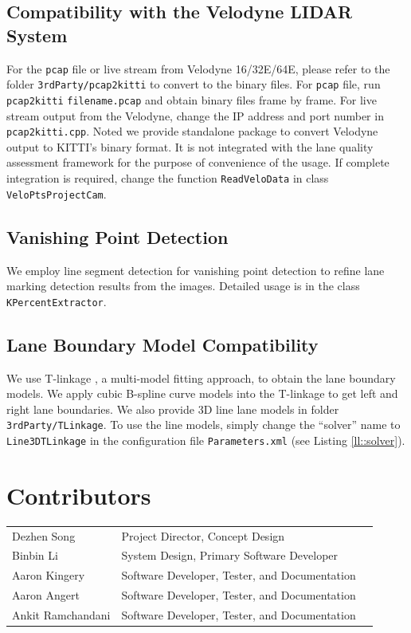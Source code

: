 \documentclass[a4paper]{article}
\begin{document}
\subsection{Compatibility with the Velodyne LIDAR System}

For the \verb+pcap+ file or  live stream from Velodyne 16/32E/64E, please refer to the folder \verb+3rdParty/pcap2kitti+ to convert to the binary files. For \verb+pcap+ file, run \verb+pcap2kitti+ \verb+filename.pcap+ and obtain binary files frame by frame. For live stream output from the Velodyne, change the IP address and port number in \verb+pcap2kitti.cpp+. Noted we provide standalone package to convert Velodyne output to KITTI's binary format. It is not integrated with the lane quality assessment framework for the purpose of convenience of the usage. If complete integration is required, change the function  \verb+ReadVeloData+ in  class \verb+VeloPtsProjectCam+. 

\subsection{Vanishing Point Detection}
We employ line segment detection \cite{von2012lsd} for vanishing point detection to refine lane marking detection results from the images. Detailed usage is in the  class \verb+KPercentExtractor+.

\subsection{Lane Boundary Model Compatibility}
We use T-linkage \cite{magri2014t}, a multi-model fitting approach, to obtain the lane boundary models. We apply cubic B-spline curve models into the T-linkage to get left and right lane boundaries. We also provide 3D line lane models in folder \verb+3rdParty/TLinkage+. To use the line models, simply change the ``solver'' name to \verb+Line3DTLinkage+  in the configuration file \verb+Parameters.xml+ (see Listing \ref{ll::solver}). 

\section{Contributors}
\begin{tabular}{lll}
	Dezhen Song       & Project Director, Concept Design              \\
	Binbin Li         & System Design, Primary Software Developer     \\
	Aaron Kingery     & Software Developer, Tester, and Documentation \\
	Aaron Angert      & Software Developer, Tester, and Documentation \\
	Ankit Ramchandani & Software Developer, Tester, and Documentation 
\end{tabular}




{\small

}
\end{document}
